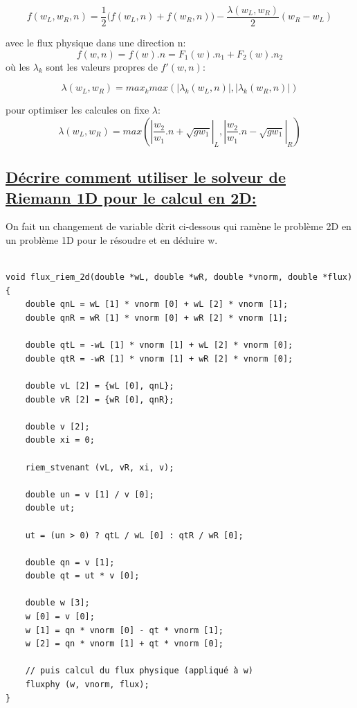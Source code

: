 $$f(w_L,w_R,n) = \frac 1 2 \big(f(w_L,n)+ f(w_R,n)\big) - \frac{\lambda(w_L,w_R)}{2}(w_R-w_L)$$

avec le flux physique dans une direction n:
$$f(w,n) = f(w).n = F_1(w).n_1 + F_2(w).n_2 $$
o\`u les $\lambda_k$ sont les valeurs propres de $f'(w,n)$:

$$\lambda(w_L,w_R) = max_k max(|\lambda_k(w_L,n)|,|\lambda_k(w_R,n)|)$$

pour optimiser les calcules on fixe $\lambda$:
$$\lambda(w_L,w_R) = max(|\frac{w_2}{w_1}.n + \sqrt{g w_1}|_L,|\frac{w_2}{w_1}.n - \sqrt{g w_1}|_R)$$


\subsection[ D\'ecrire comment utiliser le solveur de Riemann 1D pour le calcul en 2D]{\uline{D\'ecrire comment utiliser le solveur de Riemann 1D pour le calcul en 2D:}}

On fait un changement de variable d\`crit ci-dessous qui ram\`ene le probl\`eme 2D en un probl\`eme 1D pour le r\'esoudre et en d\'eduire w.

\begin{lstlisting}

void flux_riem_2d(double *wL, double *wR, double *vnorm, double *flux)
{
    double qnL = wL [1] * vnorm [0] + wL [2] * vnorm [1];
    double qnR = wR [1] * vnorm [0] + wR [2] * vnorm [1];

    double qtL = -wL [1] * vnorm [1] + wL [2] * vnorm [0];
    double qtR = -wR [1] * vnorm [1] + wR [2] * vnorm [0];

    double vL [2] = {wL [0], qnL};
    double vR [2] = {wR [0], qnR};

    double v [2];
    double xi = 0;

    riem_stvenant (vL, vR, xi, v);

    double un = v [1] / v [0];
    double ut;

    ut = (un > 0) ? qtL / wL [0] : qtR / wR [0];

    double qn = v [1];
    double qt = ut * v [0];

    double w [3];
    w [0] = v [0];
    w [1] = qn * vnorm [0] - qt * vnorm [1];
    w [2] = qn * vnorm [1] + qt * vnorm [0];

    // puis calcul du flux physique (appliqué à w)
	fluxphy (w, vnorm, flux);
}
    
\end{lstlisting}


